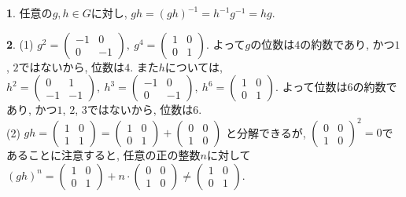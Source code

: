 \documentclass{amsart}
\theoremstyle{definition}
\newtheorem{ans}{}
\numberwithin{ans}{subsection}
\begin{document}
\begin{ans}
  任意の$g, h \in G$に対し,
  $gh = (gh)^{-1} = h^{-1}g^{-1} = hg$.
\end{ans}

\begin{ans}
  (1) $g^2 = \begin{pmatrix}
    -1 & 0 \\
    0 & -1
  \end{pmatrix},\
  g^4 = \begin{pmatrix}
    1 & 0 \\
    0 & 1
  \end{pmatrix}$.
  よって$g$の位数は$4$の約数であり, かつ$1$, $2$ではないから, 位数は$4$.
  また$h$については,
  $h^2 = \begin{pmatrix}
    0 & 1 \\
    -1 & -1
  \end{pmatrix},\
  h^3 = \begin{pmatrix}
    -1 & 0 \\
    0 & -1
  \end{pmatrix},\
  h^6 = \begin{pmatrix}
    1 & 0 \\
    0 & 1
  \end{pmatrix}$.
  よって位数は$6$の約数であり, かつ$1$, $2$, $3$ではないから, 位数は$6$.\\
  (2) $gh = \begin{pmatrix}
    1 & 0 \\
    1 & 1
  \end{pmatrix} = \begin{pmatrix}
    1 & 0 \\
    0 & 1
  \end{pmatrix} + \begin{pmatrix}
    0 & 0 \\
    1 & 0
  \end{pmatrix}$
  と分解できるが, $\begin{pmatrix}
    0 & 0 \\
    1 & 0
  \end{pmatrix}^2 = 0$であることに注意すると, 任意の正の整数$n$に対して
  $(gh)^n = \begin{pmatrix}
    1 & 0 \\
    0 & 1
  \end{pmatrix} + n \cdot \begin{pmatrix}
    0 & 0 \\
    1 & 0
  \end{pmatrix} \neq \begin{pmatrix}
    1 & 0 \\
    0 & 1
  \end{pmatrix}$.
\end{ans}
\end{document}

